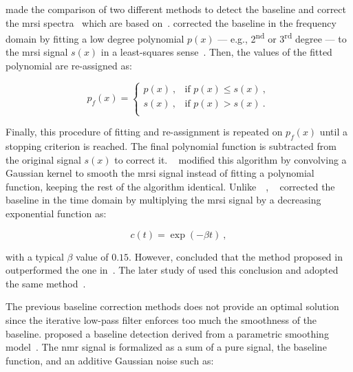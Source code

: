 \begin{enumerate}[leftmargin=*]
\citeauthor{Parfait2012} made the comparison of two different methods to detect
the baseline and correct the \ac{mrsi} spectra~\cite{Parfait2012} which are
based on~\cite{Lieber2003,Devos2004}.
\citeauthor{Lieber2003} corrected the baseline in the frequency domain by
fitting a low degree polynomial $p(x)$ --- e.g., 2\textsuperscript{nd} or
3\textsuperscript{rd} degree --- to the \ac{mrsi} signal $s(x)$ in a
least-squares sense~\cite{Lieber2003}.
Then, the values of the fitted polynomial are re-assigned as:

\begin{equation}
  p_f(x) =
  \begin{cases}
    p(x) \ , & \text{if $p(x) \leq s(x)$} \ , \\
    s(x) \ , & \text{if $p(x) > s(x)$} \ . \\
  \end{cases}
  \label{eq:lieber}
\end{equation}

Finally, this procedure of fitting and re-assignment is repeated on $p_f(x)$
until a stopping criterion is reached.
The final polynomial function is subtracted from the original signal $s(x)$ to
correct it.
\citeauthor{Parfait2012}~\cite{Parfait2012} modified this algorithm by
convolving a Gaussian kernel to smooth the \ac{mrsi} signal instead of fitting
a polynomial function, keeping the rest of the algorithm identical.
Unlike~\citeauthor{Lieber2003}~\cite{Lieber2003},
\citeauthor{Devos2004}~\cite{Devos2004} corrected the baseline in the time
domain by multiplying the \ac{mrsi} signal by a decreasing exponential function
as:

\begin{equation}
  c(t) = \exp (- \beta t) \ ,
  \label{eq:devos}
\end{equation}

\noindent with a typical $\beta$ value of $0.15$.
However, \citeauthor{Parfait2012} concluded that the method proposed
in~\cite{Lieber2003} outperformed the one in~\cite{Devos2004}.
The later study of \citeauthor{trigui2017automatic} used this conclusion and
adopted the same method~\cite{trigui2016classification,trigui2017automatic}.

The previous baseline correction methods does not provide an optimal solution
since the iterative low-pass filter enforces too much the smoothness of the
baseline.
\citeauthor{xi2008baseline} proposed a baseline detection derived from a
parametric smoothing model~\cite{xi2008baseline}.
The \ac{nmr} signal is formalized as a sum of a pure signal, the baseline
function, and an additive Gaussian noise such as:


\end{enumerate}

